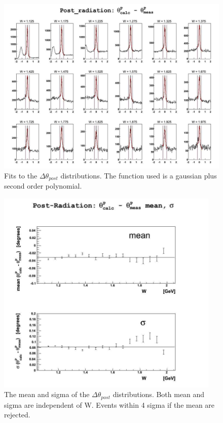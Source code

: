 \begin{landscape}
	\begin{figure}[ht]
	\centering
		\includegraphics[width=1.15\textheight]{img/dth1_no_cut.jpg}
		\caption{Fits to the $\Delta\theta_{post}$ distributions. The function used is a gaussian plus
		second order polynomial.}
		\label{fig:dth1_no_cut}
	\end{figure}
\end{landscape}

\begin{figure}[ht]
	\centering
	\includegraphics[width=0.95\textwidth]{img/dth1_fits.jpg}
	\caption{The mean and sigma of the $\Delta\theta_{post}$ distributions. Both mean and sigma are
	independent of W. Events within 4 sigma if the mean are rejected.}
	\label{fig:dth1_fits}
\end{figure}
\clearpage\newpage




